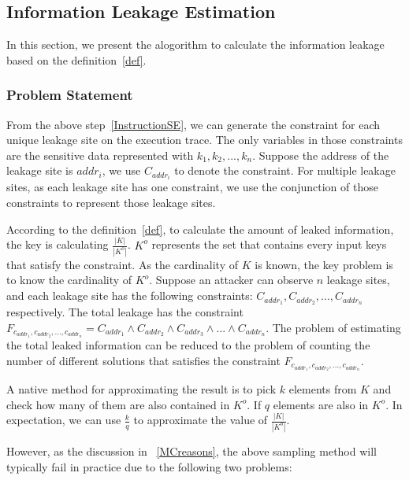 \subsection{Information Leakage Estimation}

In this section, we present the alogorithm to calculate the information
leakage based on the definition~\ref{def}. 

\subsubsection{Problem Statement}
From the above step~\ref{InstructionSE}, we can generate the constraint 
for each unique leakage site on the execution trace.
The only variables in those constraints are the sensitive data represented
with $k_1, k_2, ... , k_n$. Suppose the address of the leakage site is $addr_i$,
we use $C_{addr_i}$ to denote the constraint. For multiple leakage sites, 
as each leakage site has one constraint, we 
use the conjunction of those constraints to represent those leakage sites. 

According to the definition~\ref{def}, to calculate the amount of leaked 
information, the key is calculating $\frac{|K|}{|K^o|}$. $K^o$ represents
the set that contains every input keys that satisfy the constraint. As the 
cardinality of $K$ is known, the key problem is to know the cardinality of
$K^o$. Suppose an attacker can observe $n$ leakage sites, and each leakage site has
the following constraints: $C_{addr_1}, C_{addr_2}, ..., C_{addr_n}$ respectively. 
The total leakage has the constraint 
$F_{c_{addr_1},c_{addr_2},...,c_{addr_n}} = C_{addr_1} \land C_{addr_2} \land C_{addr_3}
\land ... \land C_{addr_n}$. The problem of estimating the total leaked information 
can be reduced to the problem of counting the number of different solutions 
that satisfies the constraint $F_{c_{addr_1},c_{addr_2},...,c_{addr_n}}$. 

A native method for approximating 
the result is to pick $k$ elements from $K$ and check how many of them are also
contained in $K^o$. If $q$ elements are also in $K^o$. In expectation, we can
use $\frac{k}{q}$ to approximate the value of $\frac{|K|}{|K^o|}$.

However, as the discussion in ~\ref{MCreasons},
the above sampling method will typically fail in practice due to the following two problems:

